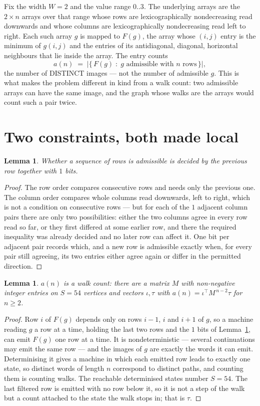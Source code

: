 \documentclass[11pt,a4paper]{article}
\theoremstyle{plain}
\newtheorem{lemma}[theorem]{Lemma}
\theoremstyle{definition}
\begin{document}
Fix the width $W=2$ and the value range $0..3$. The underlying arrays are the
$2\times n$ arrays over that range whose rows are lexicographically nondecreasing read downwards
and whose columns are lexicographically nondecreasing read left to right. Each such array $g$
is mapped to $F(g)$, the array whose $(i,j)$ entry is the minimum of $g(i,j)$ and the entries
of its antidiagonal, diagonal, horizontal neighbours that lie inside the array. The entry counts
\[
a(n)\;=\;\bigl|\{\,F(g)\;:\;g\text{ admissible with }n\text{ rows}\,\}\bigr|,
\]
the number of DISTINCT images --- not the number of admissible $g$. This is what makes the
problem different in kind from a walk count: two admissible arrays can have the same image, and
the graph whose walks are the arrays would count such a pair twice.

\section{Two constraints, both made local}

\begin{lemma}\label{lem:local}
Whether a sequence of rows is admissible is decided by the previous row together with
$1$ bits.
\end{lemma}

\begin{proof}
The row order compares consecutive rows and needs only the previous one. The column order
compares whole columns read downwards, left to right, which is not a condition on consecutive
rows --- but for each of the $1$ adjacent column pairs there are only two possibilities:
either the two columns agree in every row read so far, or they first differed at some earlier
row, and there the required inequality was already decided and no later row can affect it. One
bit per adjacent pair records which, and a new row is admissible exactly when, for every pair
still agreeing, its two entries either agree again or differ in the permitted direction.
\end{proof}

\begin{lemma}\label{lem:det}
$a(n)$ is a walk count: there are a matrix $M$ with non-negative integer entries on $S=54$
vertices and vectors $\iota,\tau$ with $a(n)=\iota^{\!\top}M^{\,n-2}\tau$ for $n\ge2$.
\end{lemma}

\begin{proof}
Row $i$ of $F(g)$ depends only on rows $i-1$, $i$ and $i+1$ of $g$, so a machine reading $g$ a
row at a time, holding the last two rows and the $1$ bits of Lemma~\ref{lem:local}, can
emit $F(g)$ one row at a time. It is nondeterministic --- several continuations may emit the
same row --- and the images of $g$ are exactly the words it can emit. Determinising it gives a
machine in which each emitted row leads to exactly one state, so distinct words of length $n$
correspond to distinct paths, and counting them is counting walks. The reachable determinised
states number $S=54$. The last filtered row is emitted with no row below it, so it is not a
step of the walk but a count attached to the state the walk stops in; that is $\tau$.
\end{proof}
\end{document}
